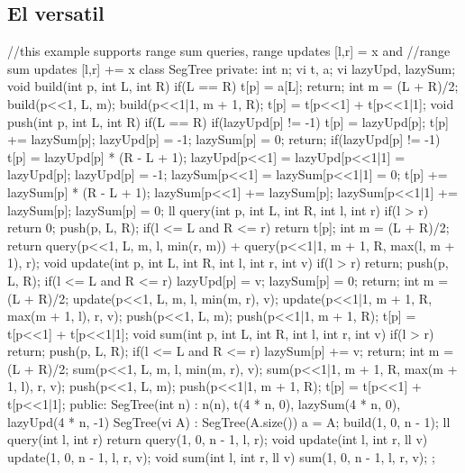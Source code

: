 \documentclass[10pt, landscape, twocolumn, a4paper, notitlepage]{article}
\begin{document}
\subsection{El versatil}
\begin{code}
//this example supports range sum queries, range updates [l,r] = x and 
//range sum updates [l,r] += x
class SegTree {
private:
    int n;
    vi t, a;
    vi lazyUpd, lazySum;
    void build(int p, int L, int R) {
        if(L == R) {t[p] = a[L]; return;}
        int m = (L + R)/2;
        build(p<<1, L, m); build(p<<1|1, m + 1, R);
        t[p] = t[p<<1] + t[p<<1|1];
    }
    void push(int p, int L, int R) {
        if(L == R) {
            if(lazyUpd[p] != -1) {
                t[p] = lazyUpd[p];
            }
            t[p] += lazySum[p];
            lazyUpd[p] = -1; lazySum[p] = 0;
            return;
        }
        if(lazyUpd[p] != -1) {
            t[p] = lazyUpd[p] * (R - L + 1);
            lazyUpd[p<<1] = lazyUpd[p<<1|1] = lazyUpd[p];
            lazyUpd[p] = -1;
            lazySum[p<<1] = lazySum[p<<1|1] = 0;
        }
        t[p] += lazySum[p] * (R - L + 1);
        lazySum[p<<1] += lazySum[p];
        lazySum[p<<1|1] += lazySum[p];
        lazySum[p] = 0;
    }
    ll query(int p, int L, int R, int l, int r) {
        if(l > r) return 0;
        push(p, L, R);
        if(l <= L and R <= r) return t[p];
        int m = (L + R)/2;
        return query(p<<1, L, m, l, min(r, m)) +
               query(p<<1|1, m + 1, R, max(l, m + 1), r);
    }
    void update(int p, int L, int R, int l, int r, int v) {
        if(l > r) return;
        push(p, L, R);
        if(l <= L and R <= r) {
            lazyUpd[p] = v; lazySum[p] = 0; return;
        }
        int m = (L + R)/2;
        update(p<<1, L, m, l, min(m, r), v);
        update(p<<1|1, m + 1, R, max(m + 1, l), r, v);
        push(p<<1, L, m);
        push(p<<1|1, m + 1, R);
        t[p] = t[p<<1] + t[p<<1|1];
    }
    void sum(int p, int L, int R, int l, int r, int v) {
        if(l > r) return;
        push(p, L, R);
        if(l <= L and R <= r) {
            lazySum[p] += v; return;
        }
        int m = (L + R)/2;
        sum(p<<1, L, m, l, min(m, r), v);
        sum(p<<1|1, m + 1, R, max(m + 1, l), r, v);
        push(p<<1, L, m);
        push(p<<1|1, m + 1, R);
        t[p] = t[p<<1] + t[p<<1|1];
    }
public: 
    SegTree(int n) : n(n), t(4 * n, 0), lazySum(4 * n, 0), 
    lazyUpd(4 * n, -1) { }
    SegTree(vi A) : SegTree(A.size()) {
        a = A;
        build(1, 0, n - 1);
    }
    ll query(int l, int r) {
        return query(1, 0, n - 1, l, r);
    }
    void update(int l, int r, ll v) {
        update(1, 0, n - 1, l, r, v);
    }
    void sum(int l, int r, ll v) {
        sum(1, 0, n - 1, l, r, v);
    }
};
\end{code}
\end{document}
